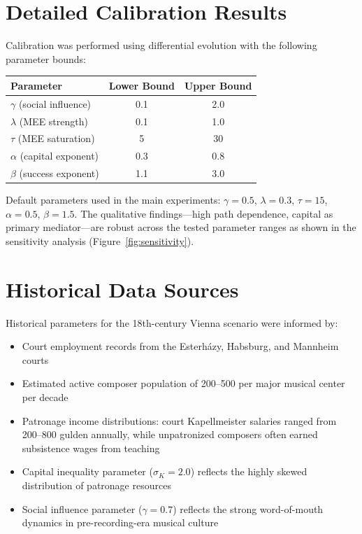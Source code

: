 \documentclass[11pt,a4paper]{article}
\begin{document}
\section{Detailed Calibration Results}
\label{app:calibration}

Calibration was performed using differential evolution with the following parameter bounds:

\begin{center}
\begin{tabular}{lcc}
\toprule
\textbf{Parameter} & \textbf{Lower Bound} & \textbf{Upper Bound} \\
\midrule
$\gamma$ (social influence) & 0.1 & 2.0 \\
$\lambda$ (MEE strength) & 0.1 & 1.0 \\
$\tau$ (MEE saturation) & 5 & 30 \\
$\alpha$ (capital exponent) & 0.3 & 0.8 \\
$\beta$ (success exponent) & 1.1 & 3.0 \\
\bottomrule
\end{tabular}
\end{center}

\noindent Default parameters used in the main experiments: $\gamma = 0.5$, $\lambda = 0.3$, $\tau = 15$, $\alpha = 0.5$, $\beta = 1.5$. The qualitative findings---high path dependence, capital as primary mediator---are robust across the tested parameter ranges as shown in the sensitivity analysis (Figure~\ref{fig:sensitivity}).

\section{Historical Data Sources}
\label{app:historical}

Historical parameters for the 18th-century Vienna scenario were informed by:

\begin{itemize}
    \item Court employment records from the Esterh\'{a}zy, Habsburg, and Mannheim courts \citep{weber1999}
    \item Estimated active composer population of 200--500 per major musical center per decade
    \item Patronage income distributions: court Kapellmeister salaries ranged from 200--800 gulden annually, while unpatronized composers often earned subsistence wages from teaching
    \item Capital inequality parameter ($\sigma_K = 2.0$) reflects the highly skewed distribution of patronage resources
    \item Social influence parameter ($\gamma = 0.7$) reflects the strong word-of-mouth dynamics in pre-recording-era musical culture
\end{itemize}
\end{document}
